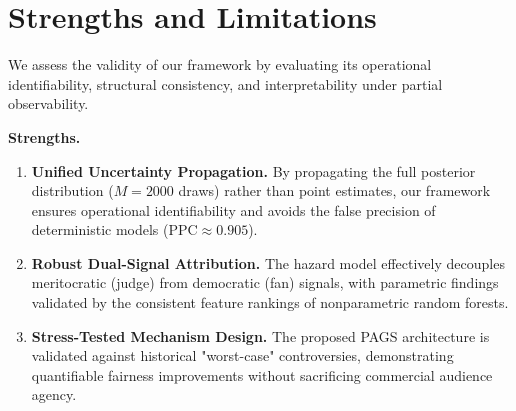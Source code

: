 \section{Strengths and Limitations}
\label{sec:evaluation}




\begingroup

\setlength{\parskip}{0pt} 

We assess the validity of our framework by evaluating its operational identifiability, structural consistency, and interpretability under partial observability.

\noindent\textbf{Strengths.}
\begin{enumerate}
    \setlength{\itemsep}{0pt}
    \setlength{\parskip}{0pt}
    \setlength{\parsep}{0pt}
    
    \item \textbf{Unified Uncertainty Propagation.} 
    By propagating the full posterior distribution ($M=2000$ draws) rather than point estimates, our framework ensures operational identifiability and avoids the false precision of deterministic models ($\mathrm{PPC} \approx 0.905$).


    \item \textbf{Robust Dual-Signal Attribution.} 
    The hazard model effectively decouples meritocratic (judge) from democratic (fan) signals, with parametric findings validated by the consistent feature rankings of nonparametric random forests.

    \item \textbf{Stress-Tested Mechanism Design.} 
    The proposed PAGS architecture is validated against historical "worst-case" controversies, demonstrating quantifiable fairness improvements without sacrificing commercial audience agency.
\end{enumerate}

